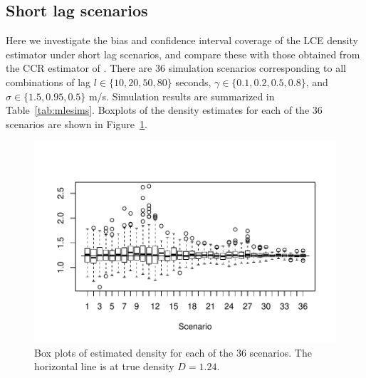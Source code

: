 \documentclass[useAMS, usenatbib, referee]{biom}\usepackage[]{graphicx}\usepackage[]{color}
\makeatletter
\def\maxwidth{ %
  \ifdim\Gin@nat@width>\linewidth
    \linewidth
  \else
    \Gin@nat@width
  \fi
}
\newenvironment{knitrout}{}{} %
\makeatother
\begin{document}
\subsection{Short lag scenarios}

Here we investigate the bias and confidence interval coverage of the LCE density estimator under short lag scenarios, and compare these with those obtained from the CCR estimator of \cite{Stevenson+al:18}. There are 36 simulation scenarios corresponding to all combinations of lag $l \in \{ 10, 20, 50, 80\}$ seconds,  $\gamma \in\{ 0.1, 0.2, 0.5, 0.8\}$, and $\sigma\in\{ 1.5, 0.95, 0.5\}$ m/s. Simulation results are summarized in Table~\ref{tab:mlesims}. Boxplots of the density estimates for each of the 36 scenarios are shown in Figure~\ref{fig:fig_boxplots}.


\begin{knitrout}
\color{fgcolor}\begin{figure}

{\centering \includegraphics[width=\maxwidth]{figs/fig_boxplots-1} 

}

\caption[Box plots of estimated density for each of the 36 scenarios]{Box plots of estimated density for each of the 36 scenarios. The horizontal line is at true density \(D=1.24\).}\label{fig:fig_boxplots}
\end{figure}


\end{knitrout}
\end{document}
